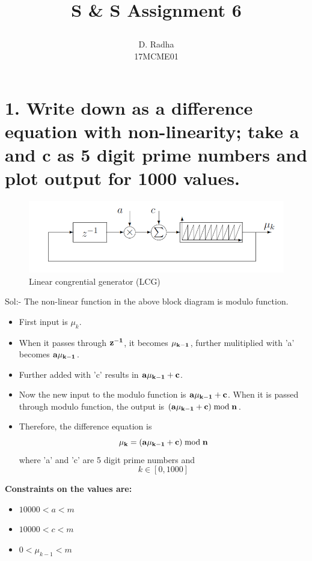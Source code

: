 \documentclass[a4paper,10pt]{article}
\title{
  \begin{large}
    S \& S Assignment 6
  \end{large}
}
\author{D. Radha\\ 17MCME01}
\begin{document}
\maketitle

\section{1. Write down as a difference equation with non-linearity; take a and c as 5 digit prime numbers and plot output for 1000 values.}
  \begin{figure}[!hbt]
    \centering
      \includegraphics[scale=0.65]{image002.png}
    \caption{Linear congrential generator (LCG)}
  \end{figure}

  \Large{Sol:- }
  The non-linear function in the above block diagram is modulo function. 

\begin{itemize}
 \item First input is $\mu_k$.
 \item When it passes through \Large{$\bf{z^{-1}}$}, it becomes $\bf{\mu_{k-1}}$, further mulitiplied with 'a' becomes $\bf{a\mu_{k-1}}$.
 \item Further added with 'c' results in $\bf{a\mu_{k-1}+c}$.
 \item Now the new input to the modulo function is $\bf{a\mu_{k-1}+c}$. When it is passed through modulo function, the output is $\bf{(a\mu_{k-1}+c)\bmod n}$.
 \item Therefore, the difference equation is \[\bf{\mu_k = (a\mu_{k-1}+c)\bmod n}\] where 'a' and 'c' are 5 digit prime numbers and \[ k \in [0, 1000] \]
\end{itemize}

 \Large{\bf{Constraints on the values are: }}
\begin{itemize}
 \item $10000 < a < m$
 \item $10000 < c < m$
 \item $0 < \mu_{k-1} < m$
\end{itemize}
\end{document}
